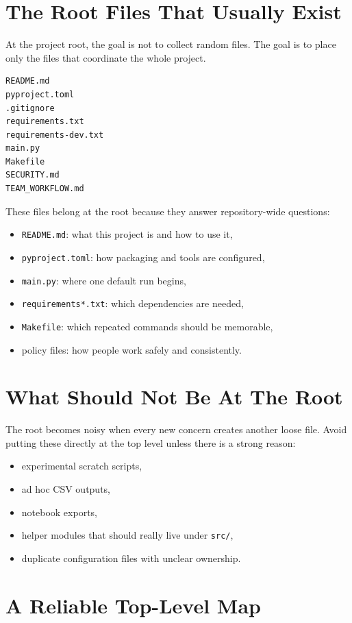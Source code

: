 \documentclass[11pt,oneside]{book}
\begin{document}
\section*{The Root Files That Usually Exist}

At the project root, the goal is not to collect random files.  
The goal is to place only the files that coordinate the whole project.

\begin{lstlisting}[style=bookcode]
README.md
pyproject.toml
.gitignore
requirements.txt
requirements-dev.txt
main.py
Makefile
SECURITY.md
TEAM_WORKFLOW.md
\end{lstlisting}

These files belong at the root because they answer repository-wide questions:
\begin{itemize}
  \item \texttt{README.md}: what this project is and how to use it,
  \item \texttt{pyproject.toml}: how packaging and tools are configured,
  \item \texttt{main.py}: where one default run begins,
  \item \texttt{requirements*.txt}: which dependencies are needed,
  \item \texttt{Makefile}: which repeated commands should be memorable,
  \item policy files: how people work safely and consistently.
\end{itemize}

\section*{What Should Not Be At The Root}

The root becomes noisy when every new concern creates another loose file.  
Avoid putting these directly at the top level unless there is a strong reason:
\begin{itemize}
  \item experimental scratch scripts,
  \item ad hoc CSV outputs,
  \item notebook exports,
  \item helper modules that should really live under \texttt{src/},
  \item duplicate configuration files with unclear ownership.
\end{itemize}

\section*{A Reliable Top-Level Map}
\end{document}
